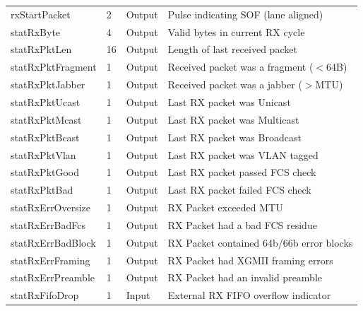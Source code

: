 \begin{longtable}[H]{
    | p{}
    | p{}
    | p{}
    | p{} |
  }
  \rowcolor{fog-grey} \multicolumn{4}{|l|}{\textbf{Receive Status and Monitoring}} \\ \hline
  rxStartPacket      & 2              & Output & Pulse indicating SOF (lane aligned) \\ \hline
  statRxByte         & 4              & Output & Valid bytes in current RX cycle \\ \hline
  statRxPktLen       & 16             & Output & Length of last received packet \\ \hline
  statRxPktFragment  & 1              & Output & Received packet was a fragment ($<$64B) \\ \hline
  statRxPktJabber    & 1              & Output & Received packet was a jabber ($>$MTU) \\ \hline
  statRxPktUcast     & 1              & Output & Last RX packet was Unicast \\ \hline
  statRxPktMcast     & 1              & Output & Last RX packet was Multicast \\ \hline
  statRxPktBcast     & 1              & Output & Last RX packet was Broadcast \\ \hline
  statRxPktVlan      & 1              & Output & Last RX packet was VLAN tagged \\ \hline
  statRxPktGood      & 1              & Output & Last RX packet passed FCS check \\ \hline
  statRxPktBad       & 1              & Output & Last RX packet failed FCS check \\ \hline
  statRxErrOversize  & 1              & Output & RX Packet exceeded MTU \\ \hline
  statRxErrBadFcs    & 1              & Output & RX Packet had a bad FCS residue \\ \hline
  statRxErrBadBlock  & 1              & Output & RX Packet contained 64b/66b error blocks \\ \hline
  statRxErrFraming   & 1              & Output & RX Packet had XGMII framing errors \\ \hline
  statRxErrPreamble  & 1              & Output & RX Packet had an invalid preamble \\ \hline
  statRxFifoDrop     & 1              & Input  & External RX FIFO overflow indicator \\ \hline


\end{longtable}
